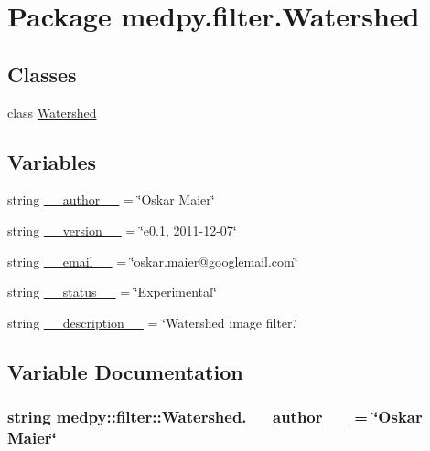 \hypertarget{namespacemedpy_1_1filter_1_1Watershed}{
\section{Package medpy.filter.Watershed}
\label{namespacemedpy_1_1filter_1_1Watershed}
}
\subsection*{Classes}
\begin{DoxyCompactItemize}
\item 
class \hyperlink{classmedpy_1_1filter_1_1Watershed_1_1Watershed}{Watershed}
\end{DoxyCompactItemize}
\subsection*{Variables}
\begin{DoxyCompactItemize}
\item 
string \hyperlink{namespacemedpy_1_1filter_1_1Watershed_a292703ad105419cbd203dbeb0ffa2025}{\_\-\_\-author\_\-\_\-} = \char`\"{}Oskar Maier\char`\"{}
\item 
string \hyperlink{namespacemedpy_1_1filter_1_1Watershed_a34650e61f770709e5dbb025c95359cd9}{\_\-\_\-version\_\-\_\-} = \char`\"{}e0.1, 2011-\/12-\/07\char`\"{}
\item 
string \hyperlink{namespacemedpy_1_1filter_1_1Watershed_a473a5c5a9495b5b00925706de0cc927b}{\_\-\_\-email\_\-\_\-} = \char`\"{}oskar.maier@googlemail.com\char`\"{}
\item 
string \hyperlink{namespacemedpy_1_1filter_1_1Watershed_a3ca58f6b2784a17f234330325e024e42}{\_\-\_\-status\_\-\_\-} = \char`\"{}Experimental\char`\"{}
\item 
string \hyperlink{namespacemedpy_1_1filter_1_1Watershed_a8021fa0fe90075a1c675387351a96040}{\_\-\_\-description\_\-\_\-} = \char`\"{}Watershed image filter.\char`\"{}
\end{DoxyCompactItemize}


\subsection{Variable Documentation}
\hypertarget{namespacemedpy_1_1filter_1_1Watershed_a292703ad105419cbd203dbeb0ffa2025}{
\subsubsection[{\_\-\_\-author\_\-\_\-}]{\setlength{\rightskip}{0pt plus 5cm}string {\bf medpy::filter::Watershed.\_\-\_\-author\_\-\_\-} = \char`\"{}Oskar Maier\char`\"{}}}
\label{namespacemedpy_1_1filter_1_1Watershed_a292703ad105419cbd203dbeb0ffa2025}


